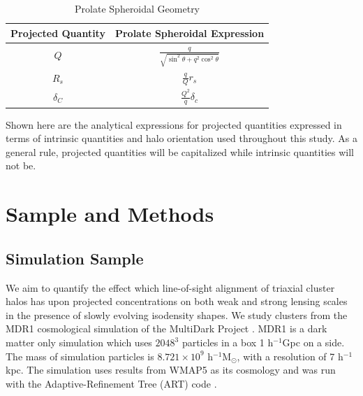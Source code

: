\begin{table}
\caption{Prolate Spheroidal Geometry}
\label{table-1}
\begin{tabular}{cc}
\hline
\hline
\textbf{Projected Quantity} & \textbf{Prolate Spheroidal Expression} \\ 
\hline 
$ Q $ &  $\frac{q}{\sqrt{\sin^{2}{\theta} + q^{2}\cos^{2}{\theta}}}$\\
\hline
$R_{s}$ &  $\frac{q}{Q}  r_{s}$\\
\hline
$\delta_{C}$ & $\frac{Q^{2}}{q} \delta_{c}$\\
\hline
\end{tabular}

\medskip
Shown here are the analytical expressions for projected quantities
expressed  in terms of intrinsic quantities and halo orientation used
throughout this study. As a general rule, projected quantities will be 
capitalized while intrinsic quantities will not be.
\end{table}

\section{Sample and Methods}
\subsection{Simulation Sample}

We aim to quantify the effect which line-of-sight alignment of
triaxial cluster halos has upon projected concentrations on both
weak and strong lensing scales in the presence of slowly evolving
isodensity shapes. We study clusters from the MDR1 cosmological
simulation \citep{PradaEtAl2012} of the MultiDark Project\footnotemark
{}.  MDR1 is a 
dark matter only simulation which uses $2048^{3}$ particles in
a box 1 h$^{-1}$Gpc on a side. The mass of simulation particles is $8.721 \times 10^{9}$ 
h$^{-1}$M$_{\odot}$, with a resolution of 7 h$^{-1}$kpc. The
simulation uses results from WMAP5 as its cosmology and was run with
the Adaptive-Refinement Tree (ART) code \citep{Kravtsov1997}.  


